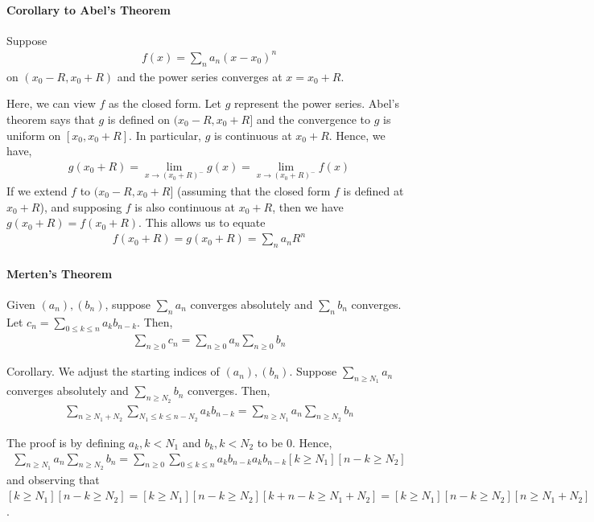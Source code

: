 \documentclass{article}
\begin{document}
\paragraph{Corollary to Abel's Theorem} Suppose
\begin{align*}
	f(x) = \sum_n a_n(x-x_0)^n
\end{align*}
on $(x_0-R, x_0+R)$ and the power series converges at $x=x_0+R$.

Here, we can view $f$ as the closed form. Let $g$ represent the power series. Abel's theorem says that $g$ is defined on $(x_0-R, x_0+R]$ and the convergence to $g$ is uniform on $[x_0, x_0+R]$. In particular, $g$ is continuous at $x_0+R$. Hence, we have,
\begin{align*}
	g(x_0+R) = \lim_{x\rightarrow (x_0+R)^-}g(x) = \lim_{x\rightarrow (x_0+R)^-}f(x)
\end{align*}
If we extend $f$ to $(x_0-R, x_0+R]$ (assuming that the closed form $f$ is defined at $x_0+R$), and supposing $f$ is also continuous at $x_0+R$, then we have $g(x_0+R) = f(x_0+R)$. This allows us to equate
\begin{align*}
	f(x_0+R) = g(x_0+R) = \sum_n a_nR^n
\end{align*}

\paragraph{Merten's Theorem} Given $(a_n),(b_n)$, suppose $\sum_n a_n$ converges absolutely and $\sum_n b_n$ converges. Let $c_n = \sum_{0\leq k\leq n} a_k b_{n-k}$. Then,
\begin{align*}
	\sum_{n\geq 0}c_n = \sum_{n\geq 0}a_n\sum_{n\geq 0}b_n
\end{align*}

Corollary. We adjust the starting indices of $(a_n), (b_n)$. Suppose $\sum_{n\geq N_1}a_n$ converges absolutely and $\sum_{n\geq N_2}b_n$ converges. Then,
\begin{align*}
	\sum_{n\geq N_1 + N_2}\sum_{N_1\leq k\leq n-N_2}a_kb_{n-k} = \sum_{n\geq N_1}a_n\sum_{n\geq N_2}b_n
\end{align*}

The proof is by defining $a_k, k < N_1$ and $b_k, k < N_2$ to be $0$. Hence,
\begin{align*}
	\sum_{n\geq N_1}a_n\sum_{n\geq N_2}b_n = \sum_{n\geq 0}\sum_{0\leq k\leq n}a_kb_{n-k}a_kb_{n-k}[k\geq N_1][n-k\geq N_2]
\end{align*}
and observing that $[k\geq N_1][n-k\geq N_2] = [k\geq N_1][n-k\geq N_2][k+n-k\geq N_1+N_2] = [k\geq N_1][n-k\geq N_2][n\geq N_1+N_2]$.
\end{document}
